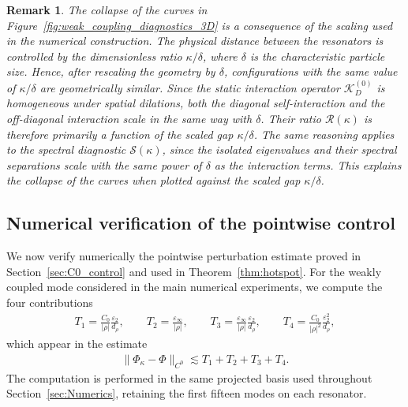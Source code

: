 \documentclass[10pt]{article}
\numberwithin{equation}{section}
\newtheorem*{remark}{Remark}
\begin{document}
\begin{remark}
The collapse of the curves in Figure~\ref{fig:weak_coupling_diagnostics_3D} is a consequence of the scaling used in the numerical construction. The physical distance between the resonators is controlled by the dimensionless ratio $\kappa/\delta$, where $\delta$ is the characteristic particle size. Hence, after rescaling the geometry by $\delta$, configurations with the same value of $\kappa/\delta$ are geometrically similar. Since the static interaction operator $\mathcal K_D^{(0)}$ is homogeneous under spatial dilations, both the diagonal self-interaction and the off-diagonal interaction scale in the same way with $\delta$. Their ratio $\mathcal R(\kappa)$ is therefore primarily a function of the scaled gap $\kappa/\delta$. The same reasoning applies to the spectral diagnostic $\mathcal S(\kappa)$, since the isolated eigenvalues and their spectral separations scale with the same power of $\delta$ as the interaction terms. This explains the collapse of the curves when plotted against the scaled gap $\kappa/\delta$.
\end{remark}













\subsection{Numerical verification of the pointwise control}
\label{subsec:numerical_C0_control}

We now verify numerically the pointwise perturbation estimate proved in Section~\ref{sec:C0_control} and used in Theorem~\ref{thm:hotspot}. For the weakly coupled mode considered in the main numerical experiments, we compute the four contributions
\begin{align*}
    T_1= \frac{C_0}{|\rho|}\frac{\varepsilon_2}{d_\rho},
    \qquad
    T_2= \frac{\varepsilon_\infty}{|\rho|},
    \qquad
    T_3= \frac{\varepsilon_\infty}{|\rho|}\frac{\varepsilon_2}{d_\rho},
    \qquad
    T_4= \frac{C_0}{|\rho|^2}\frac{\varepsilon_2^2}{d_\rho},
\end{align*}
which appear in the estimate
\begin{align*}
    \|\Phi_\kappa-\Phi\|_{C^0}
    \lesssim
    T_1+T_2+T_3+T_4.
\end{align*}
The computation is performed in the same projected basis used throughout Section~\ref{sec:Numerics}, retaining the first fifteen modes on each resonator.
\end{document}
